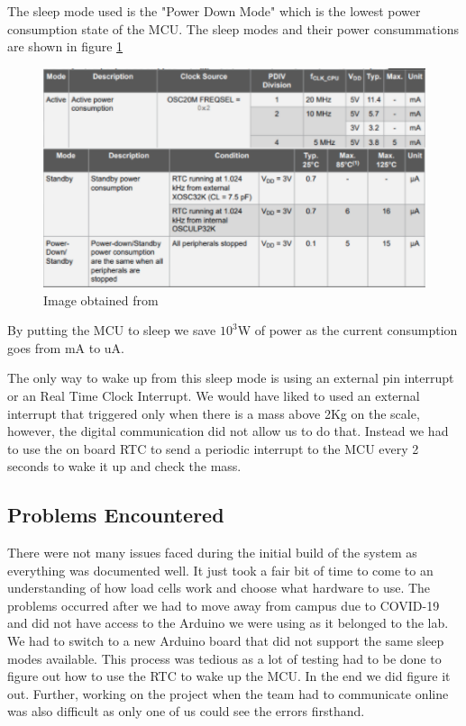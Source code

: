 \documentclass[letterpaper,11pt]{article}
\newcommand{\myLink}[2]{\href{#1}{\color{blue}\underline{\smash{\texttt{#2}}}}}
\begin{document}
The sleep mode used is the "Power Down Mode" which is the lowest power
consumption state of the MCU. The sleep modes and their power consummations are
shown in figure \ref{img:sleep}

\begin{figure}[h]
  \centering
  \includegraphics[width=1.0\textwidth]{powermodes}
  \caption{Image obtained from \myLink{http://ww1.microchip.com/downloads/en/DeviceDoc/ATmega4808-4809-Data-Sheet-DS40002173A.pdf}{ATMEGA 4809 Datasheet}}
  \label{img:sleep}
\end{figure}

By putting the MCU to sleep we save $10^3$W of power as the
current consumption goes from mA to uA.

The only way to wake up from this sleep mode is using an external pin interrupt
or an Real Time Clock Interrupt. We would have liked to used an external
interrupt that triggered only when there is a mass above 2Kg on the scale,
however, the digital communication did not allow us to do that. Instead we had
to use the on board RTC to send a periodic interrupt to the MCU every 2 seconds
to wake it up and check the mass.

\subsection{Problems Encountered}

There were not many issues faced during the initial build of the system as
everything was documented well. It just took a fair bit of time to come to an
understanding of how load cells work and choose what hardware to use. The
problems occurred after we had to move away from campus due to COVID-19 and did
not have access to the Arduino we were using as it belonged to the lab. We had
to switch to a new Arduino board that did not support the same sleep modes
available. This process was tedious as a lot of testing had to be done to figure
out how to use the RTC to wake up the MCU. In the end we did figure it
out. Further, working on the project when the team had to communicate online was
also difficult as only one of us could see the errors firsthand.
\end{document}
